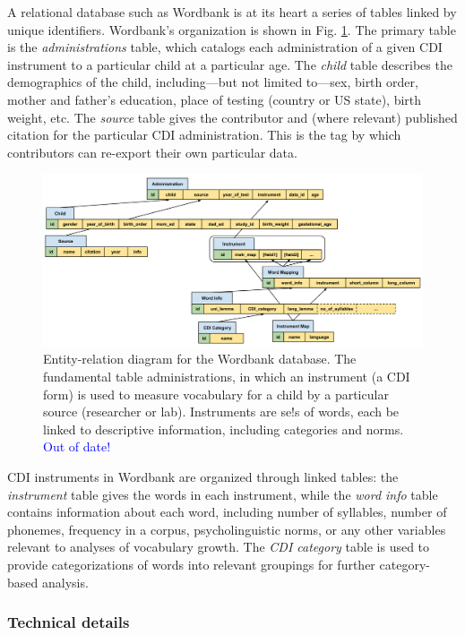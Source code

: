 \documentclass[man,noapacite]{apa2}
\newcommand{\comment}[1]{\textcolor{blue}{#1}}
\begin{document}
A relational database such as Wordbank is at its heart a series of tables linked by unique identifiers. Wordbank's organization is shown in Fig. \ref{fig:entities}. The primary table is the \emph{administrations} table, which catalogs each administration of a given CDI instrument to a particular child at a particular age. The \emph{child} table describes the demographics of the child, including---but not limited to---sex, birth order, mother and father's education, place of testing (country or US state), birth weight, etc. The \emph{source} table gives the contributor and (where relevant) published citation for the particular CDI administration. This is the tag by which contributors can re-export their own particular data.

\begin{figure}[t]
\centering
\includegraphics[width=6in]{figures/entities.pdf}
\caption{\label{fig:entities} Entity-relation diagram for the Wordbank database. The fundamental table administrations, in which an instrument (a CDI form) is used to measure vocabulary for a child by a particular source (researcher or lab). Instruments are se!s of words, each be linked to descriptive information, including categories and norms. \comment{Out of date!}}
\end{figure}

CDI instruments in Wordbank are organized through linked tables: the \emph{instrument} table gives the words in each instrument, while the \emph{word info} table contains information about each word, including number of syllables, number of phonemes, frequency in a corpus, psycholinguistic norms, or any other variables relevant to analyses of vocabulary growth. The \emph{CDI category} table is used to provide categorizations of words into relevant groupings for further category-based analysis.

\subsubsection{Technical details}
\end{document}
